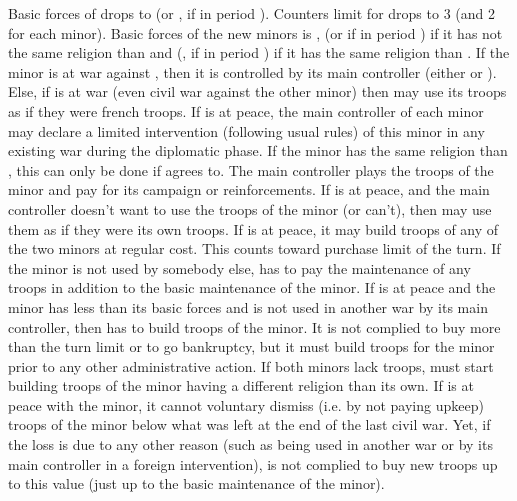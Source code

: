 \bparag Basic forces of \FRA drops to \ARMY \facemoins (or \ARMY \facemoins,
\LD if in period ). Counters limit for \FRA drops to 3 \ARMY (and 2
\ARMY for each minor).
\bparag Basic forces of the new minors is \ARMY \facemoins, \LD (or \ARMY
\faceplus if in period ) if it has not the same religion than \FRA
and \ARMY \facemoins (\ARMY \facemoins, \LD if in period ) if it
has the same religion than \FRA.
\bparag If the minor is at war against \FRA, then it is controlled by its main
controller (either \HUG or \LIG). Else, if \FRA is at war (even civil war
against the other minor) then \FRA may use its troops as if they were french
troops.
\bparag If \FRA is at peace, the main controller of each minor may declare a
limited intervention (following usual rules) of this minor in any existing war
during the diplomatic phase. If the minor has the same religion than \FRA,
this can only be done if \FRA agrees to.  The main controller plays the troops
of the minor and pay for its campaign or reinforcements.
\bparag If \FRA is at peace, and the main controller doesn't want to use the
troops of the minor (or can't), then \FRA may use them as if they were its own
troops.
\bparag If \FRA is at peace, it may build troops of any of the two minors at
regular cost. This counts toward purchase limit of the turn.
\bparag If the minor is not used by somebody else, \FRA has to pay the
maintenance of any troops in addition to the basic maintenance of the minor.
\bparag If \FRA is at peace and the minor has less than its basic forces and
is not used in another war by its main controller, then \FRA has to build
troops of the minor. It is not complied to buy more than the turn limit or to
go bankruptcy, but it must build troops for the minor prior to any other
administrative action. If both minors lack troops, \FRA must start building
troops of the minor having a different religion than its own.
\bparag If \FRA is at peace with the minor, it cannot voluntary dismiss
(i.e. by not paying upkeep) troops of the minor below what was left at the end
of the last civil war. Yet, if the loss is due to any other reason (such as
being used in another war or by its main controller in a foreign
intervention), \FRA is not complied to buy new troops up to this value (just
up to the basic maintenance of the minor).

